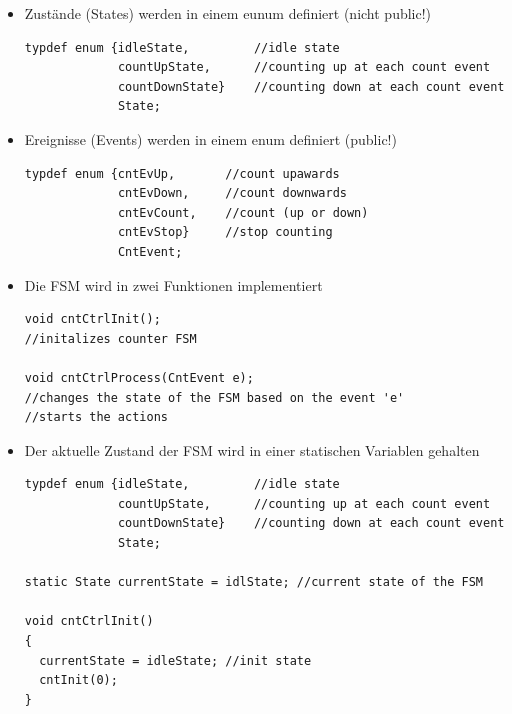 \begin{itemize}
  \item Zustände (States) werden in einem eunum definiert (nicht public!)
\begin{lstlisting}[style=C]
typdef enum {idleState,         //idle state
             countUpState,      //counting up at each count event
             countDownState}    //counting down at each count event
             State;
\end{lstlisting}
\item Ereignisse (Events) werden in einem enum definiert (public!)
	\begin{lstlisting}[style=C]
typdef enum {cntEvUp,       //count upawards
             cntEvDown,     //count downwards
             cntEvCount,    //count (up or down)
             cntEvStop}     //stop counting
             CntEvent;
\end{lstlisting}
\item Die FSM wird in zwei Funktionen implementiert
	\begin{lstlisting}[style=C]
void cntCtrlInit();
//initalizes counter FSM

void cntCtrlProcess(CntEvent e);
//changes the state of the FSM based on the event 'e'
//starts the actions
\end{lstlisting}


\item Der aktuelle Zustand der FSM wird in einer statischen Variablen gehalten
	\begin{lstlisting}[style=C]
typdef enum {idleState,         //idle state
             countUpState,      //counting up at each count event
             countDownState}    //counting down at each count event
             State;
             
static State currentState = idlState; //current state of the FSM

void cntCtrlInit()
{
  currentState = idleState; //init state
  cntInit(0);
}
\end{lstlisting}

\end{itemize}

